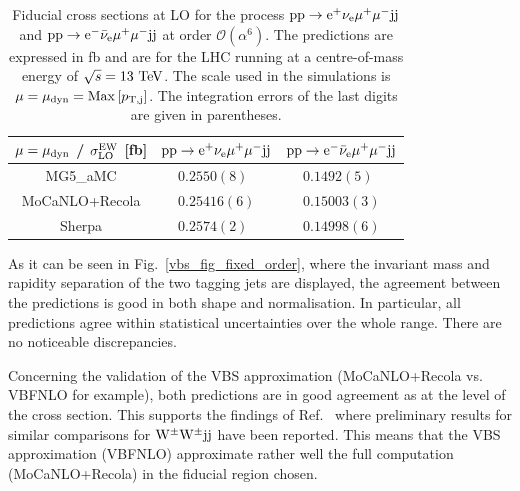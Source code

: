 \documentclass[11pt]{cernrep}
\begin{document}
\begin{table}
\begin{center} 
\begin{tabular}{ c | c | c }
 $\mu = \mu_{\rm dyn}$ / $\sigma_{\rm LO}^{\rm EW}$ [fb] & ${\rm p} {\rm p} \to {\rm e}^+  \nu_{\rm e}  \mu^+ \mu^- {\rm j} {\rm j}$  & ${\rm p} {\rm p} \to {\rm e}^-  \bar \nu_{\rm e}  \mu^+ \mu^- {\rm j} {\rm j}$  \\
  \hline\hline
  {\sc MG5\_aMC}                  & $0.2550(8)\phantom{0}$  & $0.1492(5)\phantom{0}$ \\
  {\sc MoCaNLO}+{\sc Recola}      & $0.25416(6)$            & $0.15003(3)$  \\
{\sc Sherpa}                      & $0.2574(2)\phantom{0}$  & $0.14998(6)$   \\
  \hline
\end{tabular}
\end{center}
\caption{
Fiducial cross sections at LO for the process ${\rm p}{\rm p}\to{\rm e}^+\nu_{\rm e}\mu^+\mu^-{\rm j}{\rm j}$ and ${\rm p}{\rm p}\to{\rm e}^-\bar\nu_{\rm e}\mu^+\mu^-{\rm j}{\rm j}$ at order $\mathcal{O} (\alpha^6)$.
The predictions are expressed in fb and are for the LHC running at a centre-of-mass energy of $\sqrt{s}=13 {\rm~TeV}$.
The scale used in the simulations is $\mu = \mu_{\rm dyn} = {\rm Max}\left[p_{\rm T, j}\right]$.
The integration errors of the last digits are given in parentheses.}
\label{table:xsectLOdyn}
\end{table}

As it can be seen in Fig.~\ref{vbs_fig_fixed_order}, where the invariant mass and rapidity separation of the two tagging jets are displayed, the agreement between the predictions is good in both shape and normalisation.
In particular, all predictions agree within statistical uncertainties over the whole range.
There are no noticeable discrepancies.

Concerning the validation of the VBS approximation ({\sc MoCaNLO}+{\sc Recola} vs. {\sc VBFNLO} for example), both predictions are in good agreement as at the level of the cross section.
This supports the findings of Ref.~\cite{Anders:2018gfr} where preliminary results for similar comparisons for ${\rm W}^\pm{\rm W}^\pm{\rm j}{\rm j}$ have been reported.
This means that the VBS approximation ({\sc VBFNLO}) approximate rather well the full computation ({\sc MoCaNLO}+{\sc Recola}) in the fiducial region chosen.
\end{document}
